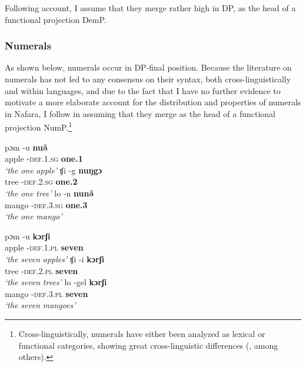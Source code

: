 \documentclass[output=paper]{langscibook}
\begin{document}
\ea\label{ex:baron:5}

\z
\z

Following  account, I assume that they merge rather high in DP, as the head of a functional projection DemP. 


\subsubsection{Numerals}
\label{sec:baron:2.1.4}
As shown below, numerals occur in DP-final position. Because the literature on numerals has not led to any consensus on their syntax, both cross-linguistically and within languages, and due to the fact that I have no further evidence to motivate a more elaborate account for the distribution and properties of numerals in Nafara, I follow \citet{Cinque2005} in assuming that they merge as the head of a functional projection NumP.\footnote{Cross-linguistically, numerals have either been analyzed as lexical or functional categories, showing great cross-linguistic differences (\citealt{Danon2012,Ionin2006}, among others).} 


\ea\label{ex:baron:6}
\ea
\gll pɔm   -u   \textbf{nuã} \\
apple -\textsc{def.1.sg}   \textbf{one.\textsc{1}}   \\
\glt \textit{‘the} \textit{one} \textit{apple’}
\ex
\gll ʧi   -g   \textbf{nuŋgɔ}   \\
tree -\textsc{def.2.sg}    \textbf{one.\textsc{2}}     \\
\glt \textit{‘the} \textit{one} \textit{tree’}
\ex
\gll lo   -n   \textbf{nunã}\\
mango -\textsc{def.3.sg}    \textbf{one.\textsc{3}}\\
\glt \textit{‘the} \textit{one} \textit{mango’}    
\z
\z

\ea\label{ex:baron:7}
\ea
\gll pɔm -u \textbf{kɔrʃi}   \\
apple -\textsc{def.1.pl} \textbf{seven}     \\
\glt \textit{‘the} \textit{seven} \textit{apples’}
\ex
\gll ʧi -i \textbf{kɔrʃi}           \\
tree -\textsc{def.2.pl} \textbf{seven}  \\
\glt \textit{‘the} \textit{seven} \textit{trees’}
\ex
\gll lo -gel \textbf{kɔrʃi}\\
mango -\textsc{def.3.pl} \textbf{seven}\\
\glt \textit{‘t}\textit{he} \textit{seven} \textit{mangoes’}
\z
\z
\end{document}
